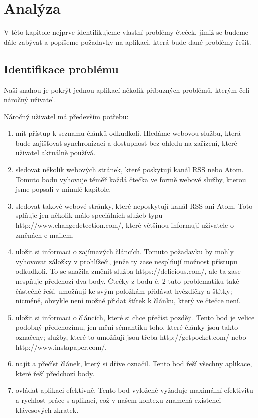\chapter{Analýza}

V této kapitole nejprve identifikujeme vlastní problémy čteček, jímiž se budeme dále zabývat a popíšeme požadavky na aplikaci, která bude dané problémy řešit.

\section{Identifikace problému}

Naší snahou je pokrýt jednou aplikací několik příbuzných problémů, kterým čelí náročný uživatel.

Náročný uživatel má především potřebu:
\begin{enumerate}
    \item mít přístup k seznamu článků odkudkoli.
        Hledáme webovou službu, která bude zajišťovat synchronizaci a dostupnost bez ohledu na zařízení, které uživatel aktuálně používá.
    \item sledovat několik webových stránek, které poskytují kanál RSS nebo Atom.
        Tomuto bodu vyhovuje téměř každá čtečka ve formě webové služby, kterou jsme popsali v minulé kapitole.
    \item sledovat takové webové stránky, které neposkytují kanál RSS ani Atom.
        Toto splňuje jen několik málo speciálních služeb typu http://www.changedetection.com/, které většinou informují uživatele o změnách e-mailem.
    \item uložit si informaci o zajímavých článcích.
        Tomuto požadavku by mohly vyhovovat záložky v prohlížeči, jenže ty zase nesplňují možnost přístupu odkudkoli.
        To se snažila změnit služba https://delicious.com/, ale ta zase nespňuje předchozí dva body.
        Čtečky z bodu č. 2 tuto problematiku také částečně řeší, umožňují ke svým položkám přidávat hvězdičky a štítky; nicméně, obvykle není možné přidat štítek k článku, který ve čtečce není.
    \item uložit si informaci o článcích, které si chce přečíst později.
        Tento bod je velice podobný předchozímu, jen mění sémantiku toho, které články jsou takto označeny; služby, které to umožňují jsou třeba http://getpocket.com/ nebo http://www.instapaper.com/.
    \item najít a přečíst článek, který si dříve označil.
        Tento bod řeší všechny aplikace, které řeší předchozí body.
    \item ovládat aplikaci efektivně.
        Tento bod vyloženě vyžaduje maximální efektivitu a rychlost práce s aplikací, což v našem kontexu znamená existenci klávesových zkratek.
\end{enumerate}

